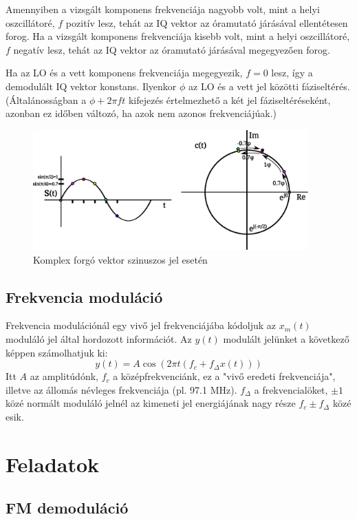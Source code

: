 \documentclass[12pt,a4paper]{article}
\begin{document}
Amennyiben a vizsgált komponens frekvenciája nagyobb volt, mint a helyi oszcillátoré, $f$ pozitív lesz, tehát az IQ vektor
az óramutató járásával ellentétesen forog.
Ha a vizsgált komponens frekvenciája kisebb volt, mint a helyi oszcillátoré, $f$ negatív lesz, tehát az IQ vektor
az óramutató járásával megegyezően forog.

Ha az LO és a vett komponens frekvenciája megegyezik, $f = 0$ lesz, így a demodulált IQ vektor konstans.
Ilyenkor $\phi$ az LO és a vett jel közötti fáziseltérés.
(Általánosságban a $\phi + 2\pi ft$ kifejezés értelmezhető a két jel fáziseltéréseként, azonban ez időben változó, ha azok nem azonos frekvenciájúak.)

\begin{figure}[htp]
	\centering
	\includegraphics[width=300pt,keepaspectratio]{figures/modulaciok_workshop_fm.eps}
	\caption{Komplex forgó vektor szinuszos jel esetén}
	\label{fig:comp_vector}
\end{figure}

\subsection{Frekvencia moduláció}

Frekvencia modulációnál egy vivő jel frekvenciájába kódoljuk az $x_m(t)$ moduláló jel által hordozott információt. Az $y(t)$ modulált jelünket a következő képpen számolhatjuk ki:
\[
  y(t) = A \cos(2 \pi t ( f_c + f_{\Delta} x(t) ) )
\]
Itt $A$ az amplitúdónk, $f_c$ a középfrekvenciánk, ez a "vivő eredeti frekvenciája", illetve az állomás névleges frekvenciája (pl. 97.1 MHz). 
$f_{\Delta}$ a frekvencialöket, $\pm 1$ közé normált moduláló jelnél az kimeneti jel energiájának nagy része $f_c \pm f_{\Delta}$ közé esik.
		
	
\clearpage
\section{Feladatok}

\subsection{FM demoduláció}
\end{document}
